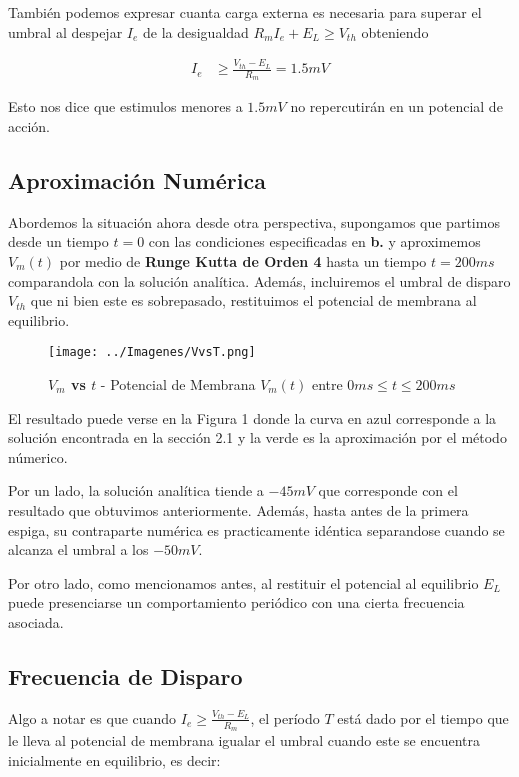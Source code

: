 \documentclass[10pt,journal,compsoc]{IEEEtran}
\begin{document}
También podemos expresar cuanta carga externa es necesaria para superar el
umbral al despejar $I_e$ de la desigualdad $R_m I_e + E_L \geq V_{th}$ obteniendo

\begin{equation*}
  \begin{aligned}
  I_e &\geq \frac{V_{th} - E_L}{R_m} = 1.5mV
  \end{aligned}
\end{equation*}

Esto nos dice que estimulos menores a $1.5mV$ no repercutirán en un potencial de
acción.
\subsection{Aproximación Numérica}
Abordemos la situación ahora desde otra perspectiva, supongamos que partimos
desde un tiempo $t = 0$ con las condiciones especificadas en \textbf{b.} y
aproximemos $V_m(t)$ por medio de \textbf{Runge Kutta de Orden 4} hasta un
tiempo $t = 200ms$ comparandola con la solución analítica. Además, incluiremos
el umbral de disparo $V_{th}$ que ni bien este es sobrepasado, restituimos el
potencial de membrana al equilibrio. 

\begin{figure}[!t]
  \centering
  \texttt{[image: ../Imagenes/VvsT.png]}
  \caption{\textbf{$V_m$ vs $t$} - Potencial de Membrana $V_m(t)$ entre $0ms
  \leq t \leq 200ms$}
  \label{fig_sim}
\end{figure}

El resultado puede verse en la Figura 1 donde la curva en azul corresponde a la
solución encontrada en la sección 2.1 y la verde es la aproximación por el método
númerico.

Por un lado, la solución analítica tiende a $-45mV$ que corresponde con el
resultado que obtuvimos anteriormente. Además, hasta antes de la primera espiga,
su contraparte numérica es practicamente idéntica separandose cuando se alcanza
el umbral a los $-50mV$.

Por otro lado, como mencionamos antes, al restituir el potencial al equilibrio
$E_L$ puede presenciarse un comportamiento periódico con una cierta frecuencia
asociada.

\subsection{Frecuencia de Disparo}
Algo a notar es que cuando $I_e \geq \frac{V_{th} - E_L}{R_m}$, el período $T$
está dado por el tiempo que le lleva al potencial de membrana igualar el umbral
cuando este se encuentra inicialmente en equilibrio, es decir:
\end{document}
